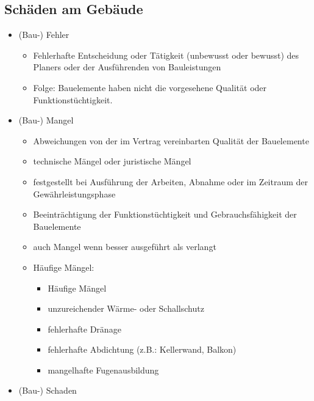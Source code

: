 \documentclass[fleqn,twoside,dvipsnames]{article}
\begin{document}
    
    \subsection{Schäden am Gebäude} \label{Bauschaden/Baufehler}
        \begin{itemize}
            \item (Bau-) Fehler
                \begin{itemize}
                    \item Fehlerhafte Entscheidung oder Tätigkeit (unbewusst oder bewusst) des Planers oder der Ausführenden von Bauleistungen
                    \item Folge: Bauelemente haben nicht die vorgesehene Qualität oder Funktionstüchtigkeit.
                \end{itemize}
            \item (Bau-) Mangel
                \begin{itemize}
                    \item Abweichungen von der im Vertrag vereinbarten Qualität der Bauelemente
                    \item technische Mängel oder juristische Mängel
                    \item festgestellt bei Ausführung der Arbeiten, Abnahme oder im Zeitraum der Gewährleistungsphase
                    \item Beeinträchtigung der Funktionstüchtigkeit und Gebrauchsfähigkeit der Bauelemente
                    \item auch Mangel wenn besser ausgeführt als verlangt
                    \item Häufige Mängel:
                        \begin{itemize}
                            \item Häufige Mängel
                            \item unzureichender Wärme- oder Schallschutz
                            \item fehlerhafte Dränage
                            \item fehlerhafte Abdichtung (z.B.: Kellerwand, Balkon)
                            \item mangelhafte Fugenausbildung
                        \end{itemize}
                \end{itemize}
            \item (Bau-) Schaden
                \begin{itemize}

\end{itemize}
\end{itemize}
\end{document}

